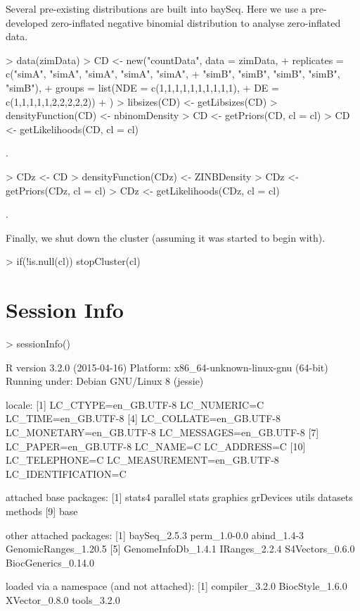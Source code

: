 \documentclass[a4paper]{article}
\begin{document}
Several pre-existing distributions are built into baySeq. Here we use a pre-developed zero-inflated negative binomial distribution to analyse zero-inflated data.

\begin{Schunk}
\begin{Sinput}
> data(zimData)
> CD <- new("countData", data = zimData, 
+           replicates = c("simA", "simA", "simA", "simA", "simA",
+             "simB", "simB", "simB", "simB", "simB"),
+           groups = list(NDE = c(1,1,1,1,1,1,1,1,1,1),
+                          DE = c(1,1,1,1,1,2,2,2,2,2))
+           )
> libsizes(CD) <- getLibsizes(CD)
> densityFunction(CD) <- nbinomDensity
> CD <- getPriors(CD, cl = cl)
> CD <- getLikelihoods(CD, cl = cl)
\end{Sinput}
\begin{Soutput}
.
\end{Soutput}
\begin{Sinput}
> CDz <- CD
> densityFunction(CDz) <- ZINBDensity
> CDz <- getPriors(CDz, cl = cl)
> CDz <- getLikelihoods(CDz, cl = cl)
\end{Sinput}
\begin{Soutput}
.
\end{Soutput}
\end{Schunk}


Finally, we shut down the cluster (assuming it was started to begin with).
\begin{Schunk}
\begin{Sinput}
> if(!is.null(cl)) stopCluster(cl)
\end{Sinput}
\end{Schunk}

\section*{Session Info}

\begin{Schunk}
\begin{Sinput}
> sessionInfo()
\end{Sinput}
\begin{Soutput}
R version 3.2.0 (2015-04-16)
Platform: x86_64-unknown-linux-gnu (64-bit)
Running under: Debian GNU/Linux 8 (jessie)

locale:
 [1] LC_CTYPE=en_GB.UTF-8       LC_NUMERIC=C               LC_TIME=en_GB.UTF-8       
 [4] LC_COLLATE=en_GB.UTF-8     LC_MONETARY=en_GB.UTF-8    LC_MESSAGES=en_GB.UTF-8   
 [7] LC_PAPER=en_GB.UTF-8       LC_NAME=C                  LC_ADDRESS=C              
[10] LC_TELEPHONE=C             LC_MEASUREMENT=en_GB.UTF-8 LC_IDENTIFICATION=C       

attached base packages:
[1] stats4    parallel  stats     graphics  grDevices utils     datasets  methods  
[9] base     

other attached packages:
[1] baySeq_2.5.3         perm_1.0-0.0         abind_1.4-3          GenomicRanges_1.20.5
[5] GenomeInfoDb_1.4.1   IRanges_2.2.4        S4Vectors_0.6.0      BiocGenerics_0.14.0 

loaded via a namespace (and not attached):
[1] compiler_3.2.0  BiocStyle_1.6.0 XVector_0.8.0   tools_3.2.0    
\end{Soutput}
\end{Schunk}
\end{document}
